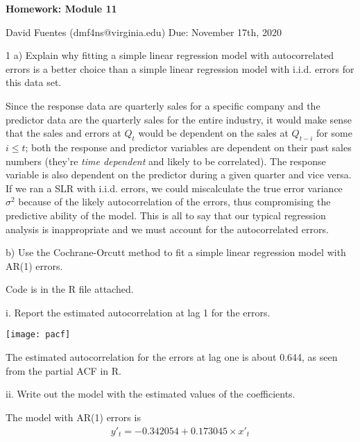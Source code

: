 \documentclass{article}
\begin{document}
\begin{flushleft}


\textbf{Homework: Module 11}
\newline


David Fuentes (dmf4ns@virginia.edu) \newline
Due: November 17th, 2020 \newline

1 a) Explain why fitting a simple linear regression model with autocorrelated errors is a better choice than a simple linear regression model with i.i.d. errors for this data set.\newline

Since the response data are quarterly sales for a specific company and the predictor data are the quarterly sales for the entire industry, it would make sense that the sales and errors at $Q_t$ would be dependent on the sales at $Q_{t-i}$ for some $i\leq t$; both the response and predictor variables are dependent on their past sales numbers (they're \emph{time dependent} and likely to be correlated). The response variable is also dependent on the predictor during a given quarter and vice versa. If we ran a SLR with i.i.d. errors, we could miscalculate the true error variance $\sigma^2$ because of the likely autocorrelation of the errors, thus compromising the predictive ability of the model. This is all to say that our typical regression analysis is inappropriate and we must account for the autocorrelated errors.\newline

b) Use the Cochrane-Orcutt method to fit a simple linear regression model with AR(1) errors.\newline

Code is in the R file attached.\newline

i. Report the estimated autocorrelation at lag 1 for the errors.\newline
\begin{center}
\texttt{[image: pacf]}
\end{center}

The estimated autocorrelation for the errors at lag one is about 0.644, as seen from the partial ACF in R. \newline

ii. Write out the model with the estimated values of the coefficients.\newline

The model with AR(1) errors is
\begin{align*}
y'_t = -0.342054 + 0.173045\times x'_t
\end{align*}


\end{flushleft}
\end{document}
